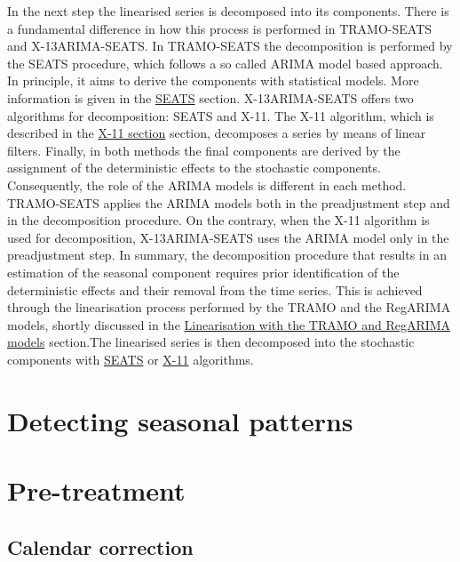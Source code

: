 \documentclass[
  letterpaper,
  DIV=11,
  numbers=noendperiod]{scrreprt}
\begin{document}
In the next step the linearised series is decomposed into its
components. There is a fundamental difference in how this process is
performed in TRAMO-SEATS and X-13ARIMA-SEATS. In TRAMO-SEATS the
decomposition is performed by the SEATS procedure, which follows a so
called ARIMA model based approach. In principle, it aims to derive the
components with statistical models. More information is given in the
\href{../theory/SA_SEATS.html}{SEATS} section. X-13ARIMA-SEATS offers
two algorithms for decomposition: SEATS and X-11. The X-11 algorithm,
which is described in the \href{../theory/SA_X11.html}{X-11 section}
section, decomposes a series by means of linear filters. Finally, in
both methods the final components are derived by the assignment of the
deterministic effects to the stochastic components. Consequently, the
role of the ARIMA models is different in each method. TRAMO-SEATS
applies the ARIMA models both in the preadjustment step and in the
decomposition procedure. On the contrary, when the X-11 algorithm is
used for decomposition, X-13ARIMA-SEATS uses the ARIMA model only in the
preadjustment step. In summary, the decomposition procedure that results
in an estimation of the seasonal component requires prior identification
of the deterministic effects and their removal from the time series.
This is achieved through the linearisation process performed by the
TRAMO and the RegARIMA models, shortly discussed in the
\href{../theory/SA_lin.html}{Linearisation with the TRAMO and RegARIMA
models} section.The linearised series is then decomposed into the
stochastic components with \href{../theory/SA_SEATS.html}{SEATS} or
\href{../theory/SA_X11.html}{X-11} algorithms.

\hypertarget{detecting-seasonal-patterns}{%
\section{Detecting seasonal
patterns}\label{detecting-seasonal-patterns}}

\hypertarget{pre-treatment}{%
\section{Pre-treatment}\label{pre-treatment}}

\hypertarget{calendar-correction}{%
\subsection{Calendar correction}\label{calendar-correction}}
\end{document}

